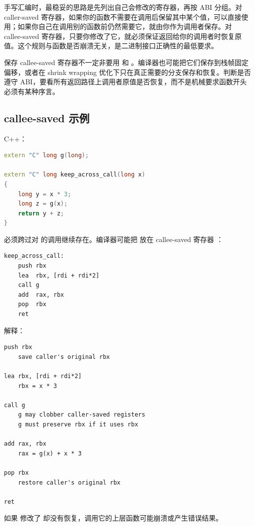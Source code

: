 手写汇编时，最稳妥的思路是先列出自己会修改的寄存器，再按 ABI 分组。对 caller-saved 寄存器，如果你的函数不需要在调用后保留其中某个值，可以直接使用；如果你自己在调用别的函数前仍然需要它，就由你作为调用者保存。对 callee-saved 寄存器，只要你修改了它，就必须保证返回给你的调用者时恢复原值。这个规则与函数是否崩溃无关，是二进制接口正确性的最低要求。

\begin{deepdive}
保存 callee-saved 寄存器不一定非要用  和 。编译器也可能把它们保存到栈帧固定偏移，或者在 shrink wrapping 优化下只在真正需要的分支保存和恢复。判断是否遵守 ABI，要看所有返回路径上调用者原值是否恢复，而不是机械要求函数开头必须有某种序言。
\end{deepdive}

\subsection{callee-saved 示例}

C++：

\begin{lstlisting}[language=C++]
extern "C" long g(long);

extern "C" long keep_across_call(long x)
{
    long y = x * 3;
    long z = g(x);
    return y + z;
}
\end{lstlisting}

 必须跨过对  的调用继续存在。编译器可能把  放在 callee-saved 寄存器 ：

\begin{lstlisting}
keep_across_call:
    push rbx
    lea  rbx, [rdi + rdi*2]
    call g
    add  rax, rbx
    pop  rbx
    ret
\end{lstlisting}

解释：

\begin{lstlisting}
push rbx
    save caller's original rbx

lea rbx, [rdi + rdi*2]
    rbx = x * 3

call g
    g may clobber caller-saved registers
    g must preserve rbx if it uses rbx

add rax, rbx
    rax = g(x) + x * 3

pop rbx
    restore caller's original rbx

ret
\end{lstlisting}

如果  修改了  却没有恢复，调用它的上层函数可能崩溃或产生错误结果。


